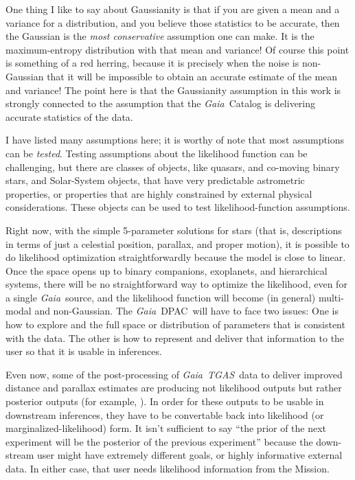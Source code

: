 \documentclass[12pt, modern]{aastex62h}
\newcommand{\acronym}[1]{{\small{#1}}}
\newcommand{\Gaia}{\textsl{Gaia}}
\newcommand{\TGAS}{\textsl{\acronym{TGAS}}}
\newcommand{\DPAC}{{\acronym{DPAC}}}
\begin{document}
One thing I like to say about Gaussianity is that if you are given a mean
and a variance for a distribution, and you believe those statistics to be
accurate, then the Gaussian is the \emph{most conservative} assumption one
can make.
It is the maximum-entropy distribution with that mean and variance!
Of course this point is something of a red herring, because it is precisely
when the noise is non-Gaussian that it will be impossible to obtain an
accurate estimate of the mean and variance!
The point here is that the Gaussianity assumption in this work is strongly connected
to the assumption that the \Gaia\ Catalog is delivering accurate statistics of
the data.

I have listed many assumptions here; it is worthy of note that most
assumptions can be \emph{tested}.
Testing assumptions about the likelihood function can be challenging,
but there are classes of objects, like quasars, and co-moving binary stars,
and Solar-System objects, that have very predictable astrometric properties,
or properties that are highly constrained by external physical considerations.
These objects can be used to test likelihood-function assumptions.

Right now, with the simple 5-parameter solutions for stars (that is, descriptions
in terms of just a celestial position, parallax, and proper motion), it is possible
to do likelihood optimization straightforwardly because the model is close to linear.
Once the space opens up to binary companions, exoplanets, and hierarchical systems,
there will be no straightforward way to optimize the likelihood, even for
a single \Gaia\ source, and the likelihood function will become
(in general) multi-modal and non-Gaussian.
The \Gaia\ \DPAC\ will have to face two issues:
One is how to explore and the full space or distribution of parameters that is
consistent with the data.
The other is how to represent and deliver that information to the user
so that it is usable in inferences.

Even now, some of the post-processing of \Gaia\ \TGAS\ data to deliver
improved distance and parallax estimates are producing not likelihood outputs
but rather posterior outputs (for example, \citealt{tri3, leistedt, anderson}).
In order for these outputs to be usable in downstream inferences,
they have to be convertable back into likelihood (or marginalized-likelihood) form.
It isn't sufficient to say ``the prior of the next experiment will be the posterior
of the previous experiment'' because the down-stream user might have extremely
different goals, or highly informative external data. In either case, that user
needs likelihood information from the Mission.
\end{document}
